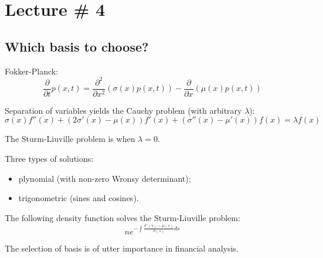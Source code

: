 \documentclass[a4paper]{article}
\newcommand{\brac}[1]{{\left ( #1 \right )}}
\begin{document}






\section{Lecture \# 4} %
\label{sec:lecture_4}

\subsection{Which basis to choose?} %
\label{sub:the_choice_of_basis}

Fokker-Planck:
\[\frac{\partial}{\partial t} p(x,t) = \frac{\partial^2}{\partial x^2} \brac{\sigma(x) p(x,t) } - \frac{\partial}{\partial x}\brac{\mu(x) p(x,t)}\]

Separation of variables yields the Cauchy problem (with arbitrary $\lambda$):
\[\sigma(x) f''(x) + \brac{2\sigma'(x) - \mu(x)} f'(x) + \brac{\sigma''(x) - \mu'(x)} f(x) = \lambda f(x)\]

The Sturm-Liuville problem is when $\lambda=0$.

Three types of solutions:
\begin{itemize}
	\item plynomial (with non-zero Wronsy determinant);
	\item trigonometric (sines and cosines).
\end{itemize}

The following density function solves the Sturm-Liuville problem:
\[n e^{-\int \frac{\sigma'(s)-\mu(s)}{\sigma(s)} ds}\]

The selection of basis is of utter importance in financial analysis.
\end{document}

